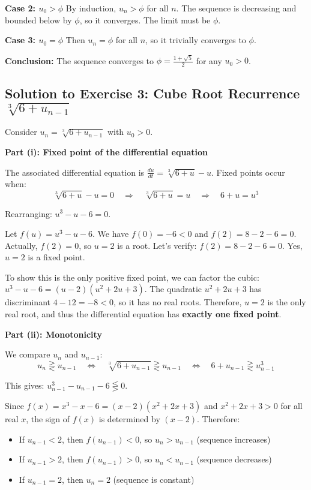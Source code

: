 \documentclass[12pt,a4paper]{article}
\theoremstyle{definition}
\begin{document}
\textbf{Case 2: $u_0 > \phi$}
By induction, $u_n > \phi$ for all $n$. The sequence is decreasing and bounded below by $\phi$, so it converges. The limit must be $\phi$.

\textbf{Case 3: $u_0 = \phi$}
Then $u_n = \phi$ for all $n$, so it trivially converges to $\phi$.

\textbf{Conclusion:} The sequence converges to $\phi = \frac{1 + \sqrt{5}}{2}$ for any $u_0 > 0$.

\subsection{Solution to Exercise 3: Cube Root Recurrence $\sqrt[3]{6 + u_{n-1}}$}

Consider $u_n = \sqrt[3]{6 + u_{n-1}}$ with $u_0 > 0$.

\textbf{Part (i): Fixed point of the differential equation}

The associated differential equation is $\frac{du}{dt} = \sqrt[3]{6 + u} - u$. Fixed points occur when:
\[
\sqrt[3]{6 + u} - u = 0 \quad \Rightarrow \quad \sqrt[3]{6 + u} = u \quad \Rightarrow \quad 6 + u = u^3
\]

Rearranging: $u^3 - u - 6 = 0$.

Let $f(u) = u^3 - u - 6$. We have $f(0) = -6 < 0$ and $f(2) = 8 - 2 - 6 = 0$. Actually, $f(2) = 0$, so $u = 2$ is a root. Let's verify: $f(2) = 8 - 2 - 6 = 0$. Yes, $u = 2$ is a fixed point.

To show this is the only positive fixed point, we can factor the cubic: $u^3 - u - 6 = (u - 2)(u^2 + 2u + 3)$. The quadratic $u^2 + 2u + 3$ has discriminant $4 - 12 = -8 < 0$, so it has no real roots. Therefore, $u = 2$ is the only real root, and thus the differential equation has \textbf{exactly one fixed point}.

\textbf{Part (ii): Monotonicity}

We compare $u_n$ and $u_{n-1}$:
\[
u_n \gtreqless u_{n-1} \quad \Leftrightarrow \quad \sqrt[3]{6 + u_{n-1}} \gtreqless u_{n-1} \quad \Leftrightarrow \quad 6 + u_{n-1} \gtreqless u_{n-1}^3
\]

This gives: $u_{n-1}^3 - u_{n-1} - 6 \lesseqgtr 0$.

Since $f(x) = x^3 - x - 6 = (x - 2)(x^2 + 2x + 3)$ and $x^2 + 2x + 3 > 0$ for all real $x$, the sign of $f(x)$ is determined by $(x - 2)$. Therefore:
\begin{itemize}
    \item If $u_{n-1} < 2$, then $f(u_{n-1}) < 0$, so $u_n > u_{n-1}$ (sequence increases)
    \item If $u_{n-1} > 2$, then $f(u_{n-1}) > 0$, so $u_n < u_{n-1}$ (sequence decreases)
    \item If $u_{n-1} = 2$, then $u_n = 2$ (sequence is constant)
\end{itemize}
\end{document}
